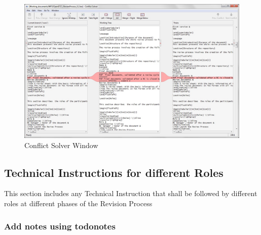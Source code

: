 \documentclass{template/openetcs_article}
\begin{document}
\begin{figure}[H]
\centering
\includegraphics[width=\textwidth]{./figures/ConflictSolverWindow.JPG}
\caption{Conflict Solver Window}
\end{figure}

\subsection{Technical Instructions for different Roles}
This section includes any Technical Instruction that shall be followed by different roles at different phases of the Revision Process

\subsubsection{Add notes using todonotes}
\end{document}
